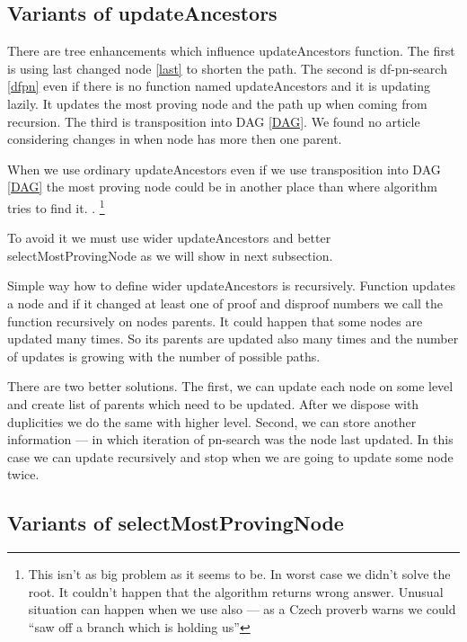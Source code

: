 \subsection{Variants of updateAncestors}

There are tree enhancements which influence updateAncestors function. The first is
using last changed node \ref{last} to shorten the path. The second is df-pn-search
\ref{dfpn} even if there is no function named updateAncestors and it is
updating lazily. It updates the most proving node and the path up when coming
from recursion. The third is transposition into DAG \ref{DAG}. We found no article
considering changes in  when node has more then one parent.

When we use ordinary updateAncestors even if we use transposition into DAG
\ref{DAG} the most proving node could be in another place than where algorithm
tries to find it. . 
\footnote{This isn't as big
problem as it seems to be. In worst case we didn't solve the root. It couldn't
happen that the algorithm returns wrong answer. Unusual situation can happen 
when we use also  \label{delete} ---
as a Czech proverb warns we could ``saw off a branch which is holding us''}
 
To avoid it we must use wider updateAncestors and better
selectMostProvingNode as we will show in next subsection. 

Simple way how to define wider updateAncestors is recursively. Function updates
a node and if it changed at least one of proof and disproof numbers we call the
function recursively on nodes parents. It could happen that some nodes are
updated many times. So its parents are updated also many times and the number
of updates is growing with the number of possible paths. 

There are two better solutions. The first, we can update each node on some level
and create list of parents which need to be updated. After we dispose with
duplicities we do the same with higher level. Second, we can store another
information --- in which iteration of pn-search was the node last updated. In
this case we can update recursively and stop when we are going to update some
node twice. 


\subsection{Variants of selectMostProvingNode}

